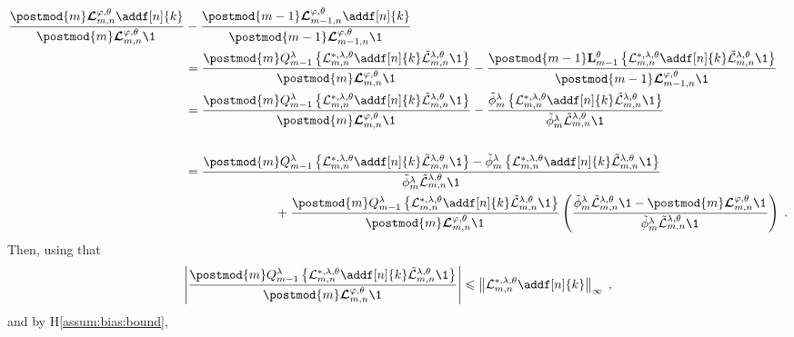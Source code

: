\documentclass{article}
\begin{document}
\begin{align*}
 \frac{\postmod{m} \retrokmod_{m, n} \addf[n]{k}}{\postmod{m} \retrokmod_{m, n} \1_{}} &- \frac{\postmod{m - 1} \retrokmod_{m - 1, n} \addf[n]{k}}{\postmod{m - 1} \retrokmod_{m - 1, n} \1_{}}  \\
&= \frac{\postmod{m} Q_{m-1}^{\parvar} \left\{\mathcal{L}^{*,\parvar,\parvec}_{m, n} \addf[n]{k}\tilde{\mathcal{L}}^{\parvar,\parvec}_{m, n} \1\right\}}{\postmod{m} \retrokmod_{m, n} \1_{}} - \frac{\postmod{m - 1} \uk{m-1}{\parvec} \left\{\mathcal{L}^{*,\parvar,\parvec}_{m, n} \addf[n]{k}\tilde{\mathcal{L}}^{\parvar,\parvec}_{m, n} \1\right\}}{\postmod{m - 1} \retrokmod_{m - 1, n} \1_{}} \\ 
&=  \frac{\postmod{m} Q_{m-1}^{\parvar} \left\{\mathcal{L}^{*,\parvar,\parvec}_{m, n} \addf[n]{k}\tilde{\mathcal{L}}^{\parvar,\parvec}_{m, n} \1\right\}}{\postmod{m} \retrokmod_{m, n} \1_{}} - \frac{\tilde\phi^\parvar_m\left\{\mathcal{L}^{*,\parvar,\parvec}_{m, n} \addf[n]{k}\tilde{\mathcal{L}}^{\parvar,\parvec}_{m, n} \1\right\}}{\tilde\phi^\parvar_m\tilde{\mathcal{L}}^{\parvar,\parvec}_{m, n}\1_{}} \\ \\
&= \frac{\postmod{m} Q_{m-1}^{\parvar} \left\{\mathcal{L}^{*,\parvar,\parvec}_{m, n} \addf[n]{k}\tilde{\mathcal{L}}^{\parvar,\parvec}_{m, n} \1\right\} - \tilde\phi^\parvar_m \left\{\mathcal{L}^{*,\parvar,\parvec}_{m, n} \addf[n]{k}\tilde{\mathcal{L}}^{\parvar,\parvec}_{m, n} \1\right\}}{\tilde\phi^\parvar_m\tilde{\mathcal{L}}^{\parvar,\parvec}_{m, n}\1_{}} \\
&\hspace{2.5cm}+  \frac{\postmod{m} Q_{m-1}^{\parvar}\left\{\mathcal{L}^{*,\parvar,\parvec}_{m, n} \addf[n]{k}\tilde{\mathcal{L}}^{\parvar,\parvec}_{m, n} \1\right\}}{\postmod{m} \retrokmod_{m, n} \1_{}}\left(\frac{\tilde\phi^\parvar_m\tilde{\mathcal{L}}^{\parvar,\parvec}_{m, n}\1-\postmod{m} \retrokmod_{m, n} \1_{}}{\tilde\phi^\parvar_m\tilde{\mathcal{L}}^{\parvar,\parvec}_{m, n}\1_{}}\right)\eqsp.
\end{align*}
Then, using that
$$
\left|\frac{\postmod{m} Q_{m-1}^{\parvar} \left\{\mathcal{L}^{*,\parvar,\parvec}_{m, n} \addf[n]{k}\tilde{\mathcal{L}}^{\parvar,\parvec}_{m, n} \1\right\}}{\postmod{m} \retrokmod_{m, n} \1_{}}\right|\leqslant \left\|\mathcal{L}^{*,\parvar,\parvec}_{m, n} \addf[n]{k}\right\|_\infty\eqsp,
$$
and by H\ref{assum:bias:bound},
\end{document}

